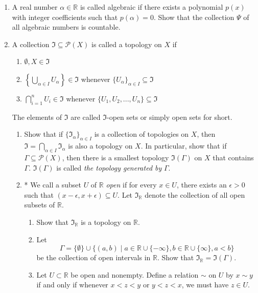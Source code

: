 \documentclass[notoc,notitlepage]{tufte-book}
\begin{document}
\begin{enumerate}
  \item A real number $\alpha \in \mathbb{R}$ is called algebraic if there exists a polynomial $p(x)$ with integer coefficients such that $p(\alpha) = 0$. Show that the collection $\Psi$ of all algebraic numbers is countable.

  \item A collection $\Im \subseteq \mathcal{P}(X)$ is called a topology on $X$ if
    \begin{enumerate}
      \item $\emptyset, X \in \Im$
      \item $\left\{ \bigcup\limits_{\alpha \in I} U_{\alpha} \right\} \in \Im$ whenever $\{ U_\alpha \}_{\alpha \in I} \subseteq \Im$
      \item $\bigcap\limits_{i=1}^{n} U_i \in \Im$ whenever $\{U_1, U_2, ..., U_n\} \subseteq \Im$
    \end{enumerate}
    The elements of $\Im$ are called $\Im$-open sets or simply open sets for short.
    \begin{enumerate}
      \item Show that if $\{ \Im_\alpha \}_{\alpha \in I}$ is a collection of topologies on $X$, then $\Im = \bigcap\limits_{\alpha \in I} \Im_\alpha$ is also a topology on $X$. In particular, show that if $\Gamma \subseteq \mathcal{P}(X)$, then there is a smallest topology $\Im(\Gamma)$ on $X$ that contains $\Gamma$. $\Im(\Gamma)$ is called \textit{the topology generated by} $\Gamma$. 
      \item * We call a subset $U$ of $\mathbb{R}$ \textit{open} if for every $x \in U$, there exists an $\epsilon > 0$ such that $( x - \epsilon, x + \epsilon ) \subseteq U$. Let $\Im_{\mathbb{R}}$ denote the collection of all open subsets of $\mathbb{R}$.
        \begin{enumerate}
          \item Show that $\Im_{\mathbb{R}}$ is a topology on $\mathbb{R}$.
          \item Let 
            \begin{equation*}
              \Gamma = \{ \emptyset \} \cup \{ (a, b) \mid a \in \mathbb{R}  \cup \{ - \infty \}, b \in \mathbb{R} \cup \{ \infty \}, a < b \}
            \end{equation*}
            be the collection of open intervals in $\mathbb{R}$. Show that $\Im_{\mathbb{R}} = \Im(\Gamma)$.
          \item Let $U \subset \mathbb{R}$ be open and nonempty. Define a relation $\sim$ on $U$ by $x \sim y$ if and only if whenever $x < z < y$ or $y < z < x$, we must have $z \in U$. \\

\end{enumerate}
\end{enumerate}
\end{enumerate}
\end{document}
